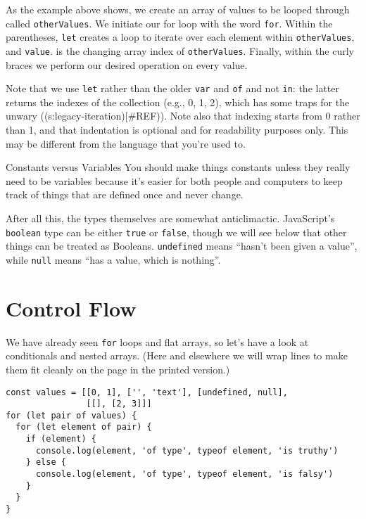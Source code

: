 As the example above shows, we create an array of values to be looped through called 
\texttt{otherValues}. We initiate our for loop with the word \texttt{for}. Within the parentheses, 
\texttt{let} creates a loop to iterate over each element within \texttt{otherValues}, and \texttt{value}.  
is the changing array index of \texttt{otherValues}. Finally, within the curly braces 
we perform our desired operation on every value. 

Note that we use \texttt{let} rather than the older \texttt{var} and \texttt{of} and not \texttt{in}:
the latter returns the indexes of the collection (e.g., 0, 1, 2),
which has some traps for the unwary ((s:legacy-iteration){[}\#REF)).
Note also that indexing starts from 0 rather than 1,
and that indentation is optional and for readability purposes only.
This may be different from the language that you're used to.

\begin{aside}{Constants versus Variables}
  You should make things constants unless they really need to be variables
  because it's easier for both people and computers to keep track of things
  that are defined once and never change.
\end{aside}

After all this,
the types themselves are somewhat anticlimactic.
JavaScript's \texttt{boolean} type can be either \texttt{true} or \texttt{false},
though we will see below that other things can be treated as Booleans.
\texttt{undefined} means ``hasn't been given a value'',
while \texttt{null} means ``has a value, which is nothing''.

\section{Control Flow}\label{s:basics-control-flow}

We have already seen \texttt{for} loops and flat arrays,
so let's have a look at conditionals and nested arrays.
(Here and elsewhere we will wrap lines to make them fit cleanly on the page
in the printed version.)

\begin{verbatim}
const values = [[0, 1], ['', 'text'], [undefined, null],
                [[], [2, 3]]]
for (let pair of values) {
  for (let element of pair) {
    if (element) {
      console.log(element, 'of type', typeof element, 'is truthy')
    } else {
      console.log(element, 'of type', typeof element, 'is falsy')
    }
  }
}
\end{verbatim}

